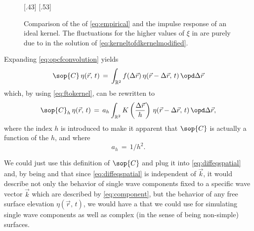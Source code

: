 \begin{figure}
    \centering
    \subcaptionbox{\label{fig:transformedkernelcomparison}}[.43\textwidth]{}
    \subcaptionbox{\label{fig:transformedkernelratio}}[.53\textwidth]{}
    \caption{Comparison of the  of \eqref{eq:empirical} and the impulse response of an ideal kernel. The fluctuations for the higher values of $\xi$ in  are purely due to  in the solution of \eqref{eq:kerneltofdkernelmodified}.}
    \label{fig:transformedkernel}
\end{figure}

Expanding \eqref{eq:opcfconvolution} yields
%
\begin{equation} \label{eq:opcfintegral}
\sop{C}\,\eta(\vec{r},\,t) \,=\, \int_{\mathbb{R}^2}f(\Delta\vec{r})\,\eta(\vec{r}-\Delta\vec{r},\,t)\,\opd\Delta\vec{r}
\end{equation}
%
which, by using \eqref{eq:ftokernel}, can be rewritten to
%
\begin{equation} \label{eq:opchunknown}
\sop{C}_h\,\eta(\vec{r},\,t) \,=\, a_h\int_{\mathbb{R}^2}K\left(\frac{\Delta\vec{r}}{h}\right)\,\eta(\vec{r}-\Delta\vec{r},\,t)\,\opd\Delta\vec{r},
\end{equation}
%
where the index $h$ is introduced to make it apparent that $\sop{C}$ is actually a function of the  $h$, and where
%
\begin{equation} \label{eq:aofh}
a_h \,=\, 1/h^2.
\end{equation}

We could just use this definition of $\sop{C}$ and plug it into \eqref{eq:diffeqspatial} and, by being \naive and \assuming that since \eqref{eq:diffeqspatial} is independent of $\vec{k}$, it would describe not only the behavior of single wave components fixed to a specific wave vector $\vec{k}$ which are described by \eqref{eq:component}, but the behavior of any free surface elevation $\eta(\vec{r},\,t)$, we would have a \PDE that we could use for simulating single wave components as well as complex (in the sense of being non-simple) surfaces.

